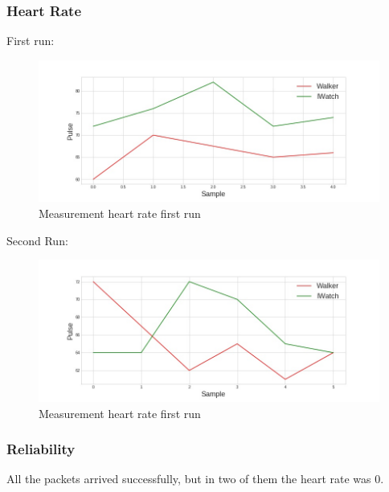 		\subsubsection{Heart Rate}
			First run:
			\begin{figure}[h]
				\centering
				\includegraphics[width=1.1\linewidth]{gfx/pulse_run1_diff.jpg}
				\caption{Measurement heart rate first run}
				\label{fig:HeartRateFirst}
			\end{figure}
			
			Second Run:
			\begin{figure}[h]
				\centering
				\includegraphics[width=1.1\linewidth]{gfx/pulse_run2_diff.jpg}
				\caption{Measurement heart rate first run}
				\label{fig:HeartRateSecond}
			\end{figure}

		\subsubsection{Reliability}
			All the packets arrived successfully, but in two of them the heart rate was 0.

